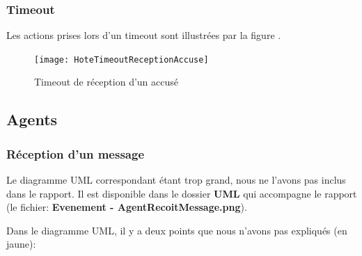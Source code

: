 \documentclass[a4paper,11pt]{article}
\begin{document}
\subsubsection{Timeout}
Les actions prises lors d'un timeout sont illustrées par la figure .

\begin{figure}[h!t]
  \centering
    \texttt{[image: HoteTimeoutReceptionAccuse]}
  \caption{Timeout de réception d'un accusé}
  \label{fig:hote-timeout}
\end{figure}











\subsection{Agents}


\subsubsection{Réception d'un message}\label{evt-agent-reception-message}
Le diagramme UML correspondant étant trop grand, nous ne l'avons pas inclus dans le rapport. Il est disponible dans le dossier \textbf{UML} qui accompagne le rapport (le fichier: \textbf{Evenement - AgentRecoitMessage.png}).

Dans le diagramme UML, il y a deux points que nous n'avons pas expliqués (en jaune):
\end{document}
